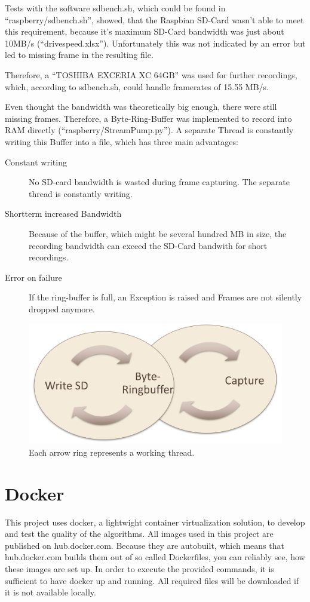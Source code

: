 Tests with the software sdbench.sh, which could be found in \enquote{raspberry/sdbench.sh}, showed, that the Raspbian SD-Card wasn't able to meet this requirement, because it's maximum SD-Card bandwidth was just about 10MB/s (\enquote{drivespeed.xlsx}). Unfortunately this was not indicated by an error but led to missing frame in the resulting file.

Therefore, a \enquote{TOSHIBA EXCERIA XC 64GB} was used for further recordings, which, according to sdbench.sh, could handle framerates of 15.55 MB/s.

Even thought the bandwidth was theoretically big enough, there were still missing frames. Therefore, a Byte-Ring-Buffer was implemented to record into RAM directly (\enquote{raspberry/StreamPump.py}). A separate Thread is constantly writing this Buffer into a file, which has three main advantages:
\begin{description}
	\item[Constant writing] No SD-card bandwidth is wasted during frame capturing. The separate thread is constantly writing.
	\item[Shortterm increased Bandwidth] Because of the buffer, which might be several hundred MB in size, the recording bandwidth can exceed the SD-Card bandwith for short recordings.
	\item[Error on failure] If the ring-buffer is full, an Exception is raised and Frames are not silently dropped anymore.
\end{description}

\begin{figure}[h!]
	\centering
	\includegraphics[width=0.9\linewidth]{bin/ringbuffer}
	\caption{Each arrow ring represents a working thread. }
	\label{fig:ringbuffer}
\end{figure} 

\section{ Docker }
This project uses docker, a lightwight container virtualization solution, to develop and test the quality of the algorithms. All images used in this project are published on hub.docker.com. Because they are autobuilt, which means that hub.docker.com builds them out of so called Dockerfiles, you can reliably see, how these images are set up. In order to execute the provided commands, it is sufficient to have docker up and running. All required files will be downloaded if it is not available locally.

